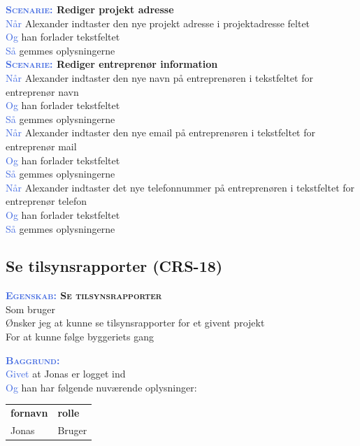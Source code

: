 \textbf{\textsc{\textcolor{RoyalBlue}{Scenarie:}} Rediger projekt adresse}\\
\textcolor{RoyalBlue}{Når} Alexander indtaster den nye projekt adresse i projektadresse feltet\\
\textcolor{RoyalBlue}{Og} han forlader tekstfeltet\\
\textcolor{RoyalBlue}{Så} gemmes oplysningerne\\

\textbf{\textsc{\textcolor{RoyalBlue}{Scenarie:}} Rediger entreprenør information}\\
\textcolor{RoyalBlue}{Når} Alexander indtaster den nye navn på entreprenøren i tekstfeltet for entreprenør navn \\
\textcolor{RoyalBlue}{Og} han forlader tekstfeltet\\
\textcolor{RoyalBlue}{Så} gemmes oplysningerne\\
\textcolor{RoyalBlue}{Når} Alexander indtaster den nye email på entreprenøren i tekstfeltet for entreprenør mail \\
\textcolor{RoyalBlue}{Og} han forlader tekstfeltet\\
\textcolor{RoyalBlue}{Så} gemmes oplysningerne\\
\textcolor{RoyalBlue}{Når} Alexander indtaster det nye telefonnummer på entreprenøren i tekstfeltet for entreprenør telefon \\
\textcolor{RoyalBlue}{Og} han forlader tekstfeltet\\
\textcolor{RoyalBlue}{Så} gemmes oplysningerne\\

\subsection{Se tilsynsrapporter (CRS-18)} \label{sec:USTilsynsrapport}
\textbf{\textsc{\textcolor{RoyalBlue}{Egenskab:} Se tilsynsrapporter}}\\
Som bruger\\
Ønsker jeg at kunne se tilsynsrapporter for et givent projekt\\
For at kunne følge byggeriets gang

\textsc{\textcolor{RoyalBlue}{\textbf{Baggrund:}}}\\
\textcolor{RoyalBlue}{Givet} at Jonas er logget ind\\
\textcolor{RoyalBlue}{Og} han har følgende nuværende oplysninger:\\
\begin{tabular}{| l | l |}
	\textbf{fornavn} & \textbf{rolle} \\
	Jonas & Bruger\\
\end{tabular}
\newline

